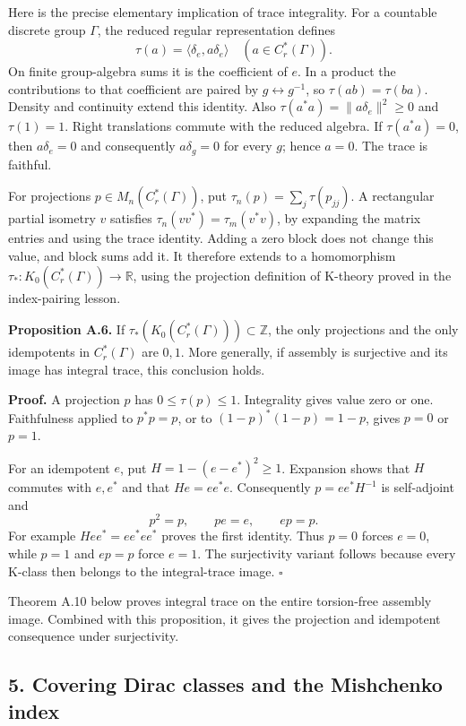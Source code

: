 \documentclass[
  11pt,
]{article}
\begin{document}
Here is the precise elementary implication of trace integrality. For a
countable discrete group \(\Gamma\), the reduced regular representation
defines \[
\tau(a)=\langle\delta_e,a\delta_e\rangle
\quad(a\in C_r^*(\Gamma)).
\tag{A27}
\] On finite group-algebra sums it is the coefficient of \(e\). In a
product the contributions to that coefficient are paired by
\(g\leftrightarrow g^{-1}\), so \(\tau(ab)=\tau(ba)\). Density and
continuity extend this identity. Also
\(\tau(a^*a)=\|a\delta_e\|^2\geq0\) and \(\tau(1)=1\). Right
translations commute with the reduced algebra. If \(\tau(a^*a)=0\), then
\(a\delta_e=0\) and consequently \(a\delta_g=0\) for every \(g\); hence
\(a=0\). The trace is faithful.

For projections \(p\in M_n(C_r^*(\Gamma))\), put
\(\tau_n(p)=\sum_j\tau(p_{jj})\). A rectangular partial isometry \(v\)
satisfies \(\tau_n(vv^*)=\tau_m(v^*v)\), by expanding the matrix entries
and using the trace identity. Adding a zero block does not change this
value, and block sums add it. It therefore extends to a homomorphism
\(\tau_*:K_0(C_r^*(\Gamma))\to\mathbb R\), using the projection
definition of K-theory proved in the index-pairing lesson.

\textbf{Proposition A.6.} If
\(\tau_*(K_0(C_r^*(\Gamma)))\subset\mathbb Z\), the only projections and
the only idempotents in \(C_r^*(\Gamma)\) are \(0,1\). More generally,
if assembly is surjective and its image has integral trace, this
conclusion holds.

\textbf{Proof.} A projection \(p\) has \(0\leq\tau(p)\leq1\).
Integrality gives value zero or one. Faithfulness applied to \(p^*p=p\),
or to \((1-p)^*(1-p)=1-p\), gives \(p=0\) or \(p=1\).

For an idempotent \(e\), put \(H=1-(e-e^*)^2\geq1\). Expansion shows
that \(H\) commutes with \(e,e^*\) and that \(He=ee^*e\). Consequently
\(p=ee^*H^{-1}\) is self-adjoint and \[
p^2=p,\qquad pe=e,\qquad ep=p.
\tag{A28}
\] For example \(H ee^*=ee^*ee^*\) proves the first identity. Thus
\(p=0\) forces \(e=0\), while \(p=1\) and \(ep=p\) force \(e=1\). The
surjectivity variant follows because every K-class then belongs to the
integral-trace image. \(\square\)

Theorem A.10 below proves integral trace on the entire torsion-free
assembly image. Combined with this proposition, it gives the projection
and idempotent consequence under surjectivity.

\subsection{5. Covering Dirac classes and the Mishchenko
index}\label{covering-dirac-classes-and-the-mishchenko-index}
\end{document}
